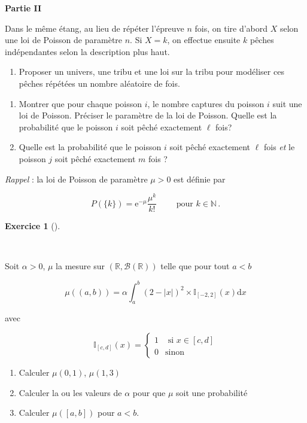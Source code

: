 \documentclass[
  french,
  11pt,
  a4paper,
  twoside,
  article,
  titlepage=false]{memoir}
\providecommand{\tightlist}{%
  \setlength{\itemsep}{0pt}\setlength{\parskip}{0pt}}
\theoremstyle{definition}
\newtheorem{exercise}{Exercice}[section]
\theoremstyle{remark}
\begin{document}
\textbf{Partie II}

Dans le même étang, au lieu de répéter l'épreuve \(n\) fois, on tire
d'abord \(X\) selon une loi de Poisson de paramètre \(n\). Si \(X=k\),
on effectue ensuite \(k\) pêches indépendantes selon la description plus
haut.

\begin{enumerate}
\def\labelenumi{\alph{enumi}.}
\setcounter{enumi}{21}
\tightlist
\item
  Proposer un univers, une tribu et une loi sur la tribu pour modéliser
  ces pêches répétées un nombre aléatoire de fois.
\end{enumerate}

\begin{enumerate}
\def\labelenumi{\roman{enumi}.}
\setcounter{enumi}{5}
\tightlist
\item
  Montrer que pour chaque poisson \(i\), le nombre captures du poisson
  \(i\) suit une loi de Poisson. Préciser le paramètre de la loi de
  Poisson. Quelle est la probabilité que le poisson \(i\) soit pêché
  exactement \(\ell\) fois?
\item
  Quelle est la probabilité que le poisson \(i\) soit pêché exactement
  \(\ell\) fois \emph{et} le poisson \(j\) soit pêché exactement \(m\)
  fois ?
\end{enumerate}

\emph{Rappel} : la loi de Poisson de paramètre \(\mu>0\) est définie par

\[P(\{k\}) =  \mathrm{e}^{-\mu} \frac{\mu^k}{k!} \qquad \text{ pour } k \in \mathbb{N}\, .\]

\begin{exercise}[]\protect\hypertarget{exr-5-a}{}\label{exr-5-a}

~

\end{exercise}

Soit \(\alpha >0\), \(\mu\) la mesure sur
\((\mathbb{R}, \mathcal{B}(\mathbb{R}))\) telle que pour tout \(a <  b\)

\[\mu((a,b)) = \alpha \int_a^b (2-|x|)^2 \times \mathbb{I}_{[-2,2]}(x) \mathrm{d}x\]

avec

\[\mathbb{I}_{[c,d]}(x) = \begin{cases} 1 & \text{ si } x \in [c,d] \\ 0 & \text{sinon}\end{cases}\]

\begin{enumerate}
\def\labelenumi{\roman{enumi}.}
\tightlist
\item
  Calculer \(\mu(0,1)\), \(\mu(1, 3)\)
\item
  Calculer la ou les valeurs de \(\alpha\) pour que \(\mu\) soit une
  probabilité
\item
  Calculer \(\mu([a,b])\) pour \(a<b\).
\end{enumerate}
\end{document}

